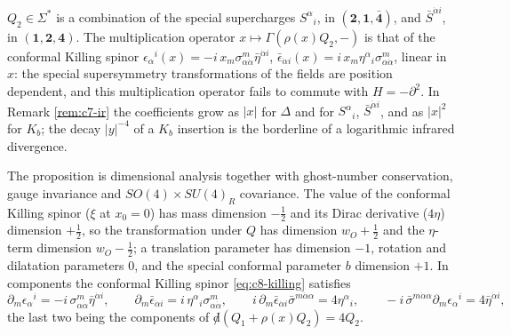 \begin{remark}
$Q_2\in\Sigma^*$ is a combination of the special supercharges $S^\alpha{}_i$, in $(\mathbf2,\mathbf1,\bar{\mathbf4})$, and $\bar S^{\dot\alpha i}$, in $(\mathbf1,\mathbf2,\mathbf4)$. The multiplication operator $x\mapsto\Gamma(\rho(x)Q_2,-)$ is that of the conformal Killing spinor $\epsilon_\alpha{}^i(x)=-i\,x_m\sigma^m_{\alpha\dot\alpha}\bar\eta^{\dot\alpha i}$, $\bar\epsilon_{\dot\alpha i}(x)=i\,x_m\eta^\alpha{}_i\sigma^m_{\alpha\dot\alpha}$, linear in $x$: the special supersymmetry transformations of the fields are position dependent, and this multiplication operator fails to commute with $H=-\partial^2$. In Remark \ref{rem:c7-ir} the coefficients grow as $|x|$ for $\Delta$ and for $S^\alpha{}_i$, $\bar S^{\dot\alpha i}$, and as $|x|^2$ for $K_b$; the decay $|y|^{-4}$ of a $K_b$ insertion is the borderline of a logarithmic infrared divergence.
\end{remark}

\begin{remark}
The proposition is dimensional analysis together with ghost-number conservation, gauge invariance and $SO(4)\times SU(4)_R$ covariance. The value of the conformal Killing spinor ($\xi$ at $x_0=0$) has mass dimension $-\tfrac12$ and its Dirac derivative ($4\eta$) dimension $+\tfrac12$, so the transformation under $Q$ has dimension $w_O+\tfrac12$ and the $\eta$-term dimension $w_O-\tfrac12$; a translation parameter has dimension $-1$, rotation and dilatation parameters $0$, and the special conformal parameter $b$ dimension $+1$. In components the conformal Killing spinor \eqref{eq:c8-killing} satisfies
\[
\partial_m\epsilon_\alpha{}^i=-i\,\sigma^m_{\alpha\dot\alpha}\bar\eta^{\dot\alpha i},\qquad \partial_m\bar\epsilon_{\dot\alpha i}=i\,\eta^\alpha{}_i\sigma^m_{\alpha\dot\alpha},\qquad i\,\partial_m\bar\epsilon_{\dot\alpha i}\bar\sigma^{m\dot\alpha\alpha}=4\eta^\alpha{}_i,\qquad -i\,\bar\sigma^{m\dot\alpha\alpha}\partial_m\epsilon_\alpha{}^i=4\bar\eta^{\dot\alpha i},
\]
the last two being the components of ${\not d}(Q_1+\rho(x)Q_2)=4Q_2$.
\end{remark}

